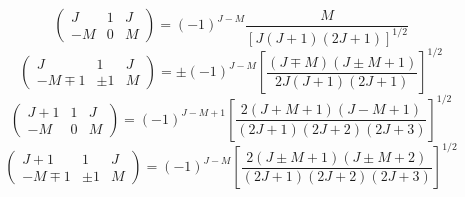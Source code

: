 
\begin{equation}
\left( \begin{array}{ccc} 
 J &  1 &  J  \\
-M &  0 &  M   \end{array} \right) = (-1)^{J-M} \frac{M}{ [J(J+1)(2J+1)]^{1/2} }
\end{equation}
\begin{equation}
\left( \begin{array}{ccc} 
 J       &     1 &  J  \\
-M \mp 1 & \pm 1 &  M   \end{array} \right) = 
\pm (-1)^{J-M} \left[ \frac{(J \mp M)(J\pm M +1)}{ 2J(J+1)(2J+1)} \right] ^{1/2}
\end{equation}
\begin{equation}
\left( \begin{array}{ccc} 
 J+1     &     1 &  J  \\
-M       &     0 &  M   \end{array} \right) = 
 (-1)^{J-M+1} \left[ \frac{2 (J + M+1)(J - M +1)}{(2J+1)(2J+2)(2J+3)} \right] ^{1/2}
\end{equation}
\begin{equation}
\left( \begin{array}{ccc} 
 J+1     &     1 &  J  \\
-M \mp 1 & \pm 1 &  M   \end{array} \right) = 
 (-1)^{J-M} \left[ \frac{2 (J \pm M+1)(J \pm M +2)}{(2J+1)(2J+2)(2J+3)} \right] ^{1/2}
\end{equation}
